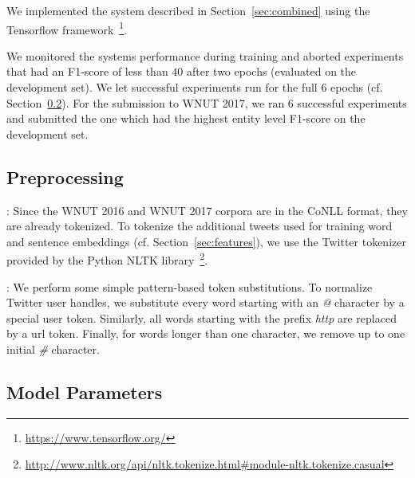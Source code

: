 \documentclass[11pt,letterpaper]{article}
\begin{document}
We implemented the system described in Section~\ref{sec:combined} using the Tensorflow
framework~\footnote{\url{https://www.tensorflow.org/}}.

We monitored the systems performance during training and aborted experiments that had 
an F1-score of less than $40$ after two epochs (evaluated on the development set).
We let successful experiments run for the full $6$ epochs (cf. Section~\ref{sec:params}).
For the submission to WNUT 2017, we ran $6$ successful experiments and submitted
the one which had the highest entity level F1-score on the development set.

\subsection{Preprocessing}

: Since the WNUT 2016 and WNUT 2017 corpora are in the
CoNLL format, they are already tokenized. To tokenize the additional tweets used
for training word and sentence embeddings (cf. Section~\ref{sec:features}), we
use the Twitter tokenizer provided by the Python NLTK
library~\footnote{\url{http://www.nltk.org/api/nltk.tokenize.html\#module-nltk.tokenize.casual}}.

: We perform some simple pattern-based token
substitutions. To normalize Twitter user handles, we substitute every word
starting with an \textit{@} character by a special user token. Similarly, all
words starting with the prefix \textit{http} are replaced by a url token. Finally,
for words longer than one character, we remove up to one initial \textit{\#}
character.

\subsection{Model Parameters}
\label{sec:params}
\end{document}
